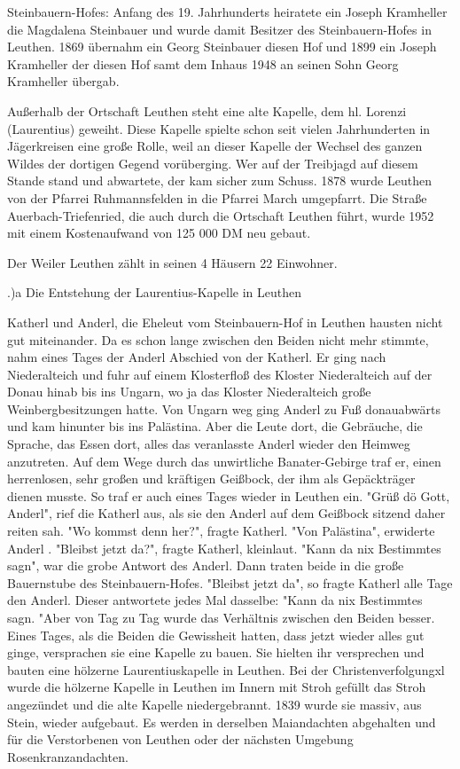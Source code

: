 Steinbauern-Hofes: Anfang des 19. Jahrhunderts heiratete ein Joseph Kramheller
die Magdalena Steinbauer und wurde damit Besitzer des Steinbauern-Hofes in
Leuthen. 1869 übernahm ein Georg Steinbauer diesen Hof und 1899 ein Joseph
Kramheller der diesen Hof samt dem Inhaus 1948 an seinen Sohn Georg Kramheller
übergab.

Außerhalb der Ortschaft Leuthen steht eine alte Kapelle, dem hl. Lorenzi
(Laurentius) geweiht. Diese Kapelle spielte schon seit vielen Jahrhunderten in
Jägerkreisen eine große Rolle, weil an dieser Kapelle der Wechsel des ganzen
Wildes der dortigen Gegend vorüberging. Wer auf der Treibjagd auf diesem Stande
stand und abwartete, der kam sicher zum Schuss. 1878 wurde Leuthen von der
Pfarrei Ruhmannsfelden in die Pfarrei March umgepfarrt. Die Straße
Auerbach-Triefenried, die auch durch die Ortschaft Leuthen führt, wurde 1952 mit
einem Kostenaufwand von 125 000 DM neu gebaut.

Der Weiler Leuthen zählt in seinen 4 Häusern 22 Einwohner.

.)a Die Entstehung der Laurentius-Kapelle in Leuthen

Katherl und Anderl, die Eheleut vom Steinbauern-Hof in Leuthen hausten nicht gut
miteinander. Da es schon lange zwischen den Beiden nicht mehr stimmte, nahm
eines Tages der Anderl Abschied von der Katherl. Er ging nach Niederalteich und
fuhr auf einem Klosterfloß des Kloster Niederalteich auf der Donau hinab bis ins
Ungarn, wo ja das Kloster Niederalteich große Weinbergbesitzungen hatte. Von
Ungarn weg ging Anderl zu Fuß donauabwärts und kam hinunter bis ins Palästina.
Aber die Leute dort, die Gebräuche, die Sprache, das Essen dort, alles das
veranlasste Anderl wieder den Heimweg anzutreten. Auf dem Wege durch das
unwirtliche Banater-Gebirge traf er, einen herrenlosen, sehr großen und
kräftigen Geißbock, der ihm als Gepäckträger dienen musste. So traf er auch
eines Tages wieder in Leuthen ein. "Grüß dö Gott, Anderl", rief die Katherl aus,
als sie den Anderl auf dem Geißbock sitzend daher reiten sah. "Wo kommst denn
her?", fragte Katherl. "Von Palästina", erwiderte Anderl . "Bleibst jetzt da?",
fragte Katherl, kleinlaut. "Kann da nix Bestimmtes sagn", war die grobe Antwort
des Anderl. Dann traten beide in die große Bauernstube des Steinbauern-Hofes.
"Bleibst jetzt da", so fragte Katherl alle Tage den Anderl. Dieser antwortete
jedes Mal dasselbe: "Kann da nix Bestimmtes sagn. "Aber von Tag zu Tag wurde das
Verhältnis zwischen den Beiden besser. Eines Tages, als die Beiden die
Gewissheit hatten, dass jetzt wieder alles gut ginge, versprachen sie eine
Kapelle zu bauen. Sie hielten ihr versprechen und bauten eine hölzerne
Laurentiuskapelle in Leuthen. Bei der Christenverfolgungxl wurde die hölzerne
Kapelle in Leuthen im Innern mit Stroh gefüllt das Stroh angezündet und die alte
Kapelle niedergebrannt. 1839 wurde sie massiv, aus Stein, wieder aufgebaut. Es
werden in derselben Maiandachten abgehalten und für die Verstorbenen von Leuthen
oder der nächsten Umgebung Rosenkranzandachten.

